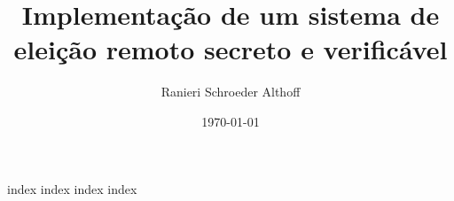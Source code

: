 \documentclass[
    a5paper,
    twoside,
    english,
    brazil,
    chapter=TITLE,
    section=TITLE,
]{abntex2}
\title{Implementação de um sistema de eleição remoto secreto e verificável}
\author{Ranieri Schroeder Althoff}
\date{\today}
\begin{document}
\sffamily

\pretextual



\textual

{index}
{index}
{index}
{index}

\printbibliography
\end{document}
